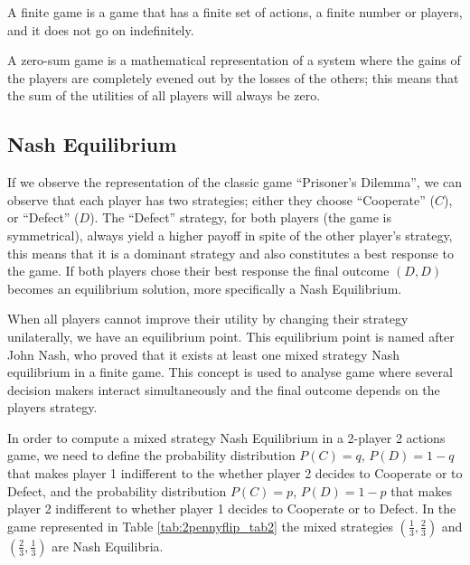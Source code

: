 A finite game is a game that has a finite set of actions, a finite number or players, and it does not go on indefinitely.

A zero-sum game is a mathematical representation of a system where the gains of the players are completely evened out by the losses of the others; this means that the sum of the utilities of all players will always be zero.





\subsection{Nash Equilibrium}
\label{subsec:background:game_theory_nash_equilibrium}

If we observe the representation of the classic game ``Prisoner's Dilemma'', we can observe that each player has two strategies; either they choose ``Cooperate'' ($C$), or ``Defect'' ($D$). The ``Defect'' strategy, for both players (the game is symmetrical), always yield a higher payoff in spite of the other player's strategy, this means that it is a dominant strategy and also constitutes a best response to the game. If both players chose their best response the final outcome $(D,D)$ becomes an equilibrium solution, more specifically a Nash Equilibrium. 

When all players cannot improve their utility by changing their strategy unilaterally, we have an equilibrium point. This equilibrium point is named after John Nash, who proved that it exists at least one mixed strategy Nash equilibrium in a finite game\cite{nash50}\cite{Nash51}. This concept is used to analyse game where several decision makers interact simultaneously and the final outcome depends on the players strategy\cite{Osborne2004}.

In order to compute a mixed strategy Nash Equilibrium in a 2-player 2 actions game, we need to define the probability distribution $P(C)=q$, $P(D)=1-q$ that makes player 1 indifferent to the whether player 2 decides to Cooperate or to Defect, and the probability distribution $P(C)=p$, $P(D)=1-p$ that makes player 2 indifferent to whether player 1 decides to Cooperate or to Defect. In the game represented in Table \ref{tab:2pennyflip_tab2} the  mixed strategies $(\frac{1}{3} , \frac{2}{3})$ and $(\frac{2}{3} , \frac{1}{3})$ are Nash Equilibria.

